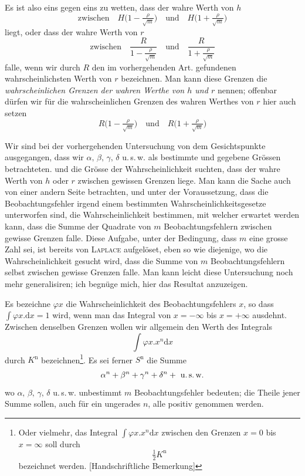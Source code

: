 \par
Es ist also eins gegen eins zu wetten, dass der wahre Werth von \(h\)
\[
\text{zwischen}\quad H\bigl(1-\tfrac\rho{\surd m}\bigr)\quad\text{und}\quad H\bigl(1+\tfrac\rho{\surd m}\bigr)
\]
liegt, oder dass der wahre Werth von \(r\)
\[
\text{zwischen}\quad\frac{R}{1-\frac\rho{\surd m}}\quad\text{und}\quad\frac{R}{1+\frac\rho{\surd m}}
\]
falle, wenn wir durch \(R\) den im vorhergehenden Art. gefundenen wahrscheinlichsten Werth von \(r\) bezeichnen. Man kann diese Grenzen die \textit{wahrscheinlichen Grenzen der wahren Werthe von \(h\) und \(r\)} nennen; offenbar dürfen wir für die wahrscheinlichen Grenzen des wahren Werthes von \(r\) hier auch setzen
\[
R\bigl(1-\tfrac\rho{\surd m}\bigr)\quad\text{und}\quad R\bigl(1+\tfrac\rho{\surd m}\bigr)
\]

Wir sind bei der vorhergehenden Untersuchung von dem Gesichtspunkte ausgegangen, dass wir \(\alpha,\,\beta,\,\gamma,\,\delta\) u.\,s.\,w. als bestimmte und gegebene Grössen betrachteten. und die Grösse der Wahrscheinlichkeit suchten, dass der wahre Werth von \(h\) oder \(r\) zwischen gewissen Grenzen liege. Man kann die Sache auch von einer andern Seite betrachten, und unter der Voraussetzung, dass die Beobachtungsfehler irgend einem bestimmten Wahrscheinlichkeitsgesetze unterworfen sind, die Wahrscheinlichkeit bestimmen, mit welcher erwartet werden kann, dass die Summe der Quadrate von \(m\) Beobachtungsfehlern zwischen gewisse Grenzen falle. Diese Aufgabe, unter der Bedingung, dass \(m\) eine grosse Zahl sei, ist bereits von \textsc{Laplace} aufgelöset, eben so wie diejenige, wo die Wahrscheinlichkeit gesucht wird, dass die Summe von \(m\) Beobachtungsfehlern selbst zwischen gewisse Grenzen falle. Man kann leicht diese Untersuchung noch mehr generalisiren; ich begnüge mich, hier das Resultat anzuzeigen.

Es bezeichne \(\varphi x\) die Wahrscheinlichkeit des Beobachtungsfehlers \(x\), so dass \(\int\varphi x.\mathrm{d}x=1\) wird, wenn man das Integral von \(x=-\infty\) bis \(x=+\infty\) ausdehnt. Zwischen denselben Grenzen wollen wir allgemein den Werth des Integrals
\[
\int\varphi x.x^n\mathrm{d}x
\]
durch \(K^{\mathrm n}\) bezeichnen\footnote{Oder vielmehr, das Integral \(\int\varphi x.x^n\mathrm{d}x\) zwischen den Grenzen \(x=0\) bis \(x=\infty\) soll durch
\[\tfrac12K^{\mathrm n}\]
bezeichnet werden. [Handschriftliche Bemerkung]}. Es sei ferner \(S^{\mathrm n}\) die Summe
\[
\alpha^n+\beta^n+\gamma^n+\delta^n+\text{ u.\,s.\,w.}
\]
wo \(\alpha,\,\beta,\,\gamma,\,\delta\) u.\,s.\,w. unbestimmt \(m\) Beobachtungsfehler bedeuten; die Theile jener Summe sollen, auch für ein ungerades \(n\), alle positiv genommen werden.

